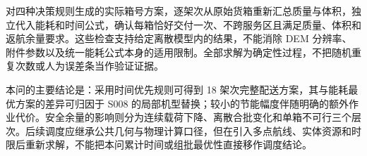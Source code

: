 对四种决策规则生成的实际箱号方案，逐架次从原始货箱重新汇总质量与体积，独立代入能耗和时间公式，确认每箱恰好交付一次、不跨服务区且满足质量、体积和返航余量要求。这些检查支持给定离散模型内的结果，不能消除 DEM 分辨率、附件参数以及统一能耗公式本身的适用限制。全部求解为确定性过程，不把随机重复次数或人为误差条当作验证证据。

本问的主要结论是：采用时间优先规则可得到 18 架次完整配送方案，其与能耗最优方案的差异可归因于 S008 的局部机型替换；较小的节能幅度伴随明确的额外作业代价。安全余量的影响则分为连续载荷下降、离散合批变化和单箱不可行三个层次。后续调度应继承公共几何与物理计算口径，但在引入多点航线、实体资源和时限后重新求解，不能把本问累计时间或组批最优性直接移作调度结论。
